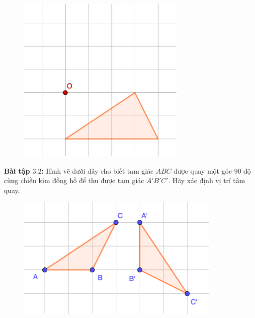 \begin{multicols}{2}
\begin{figure}[H]
		\includegraphics[width= 1\linewidth]{Picture27}
		\vspace*{-10pt}
	\end{figure}
	\textbf{\color{toancuabi}Bài tập $\pmb{3.2}$:} Hình vẽ dưới đây cho biết tam giác $ABC$ được quay một góc $90$ độ cùng chiều kim đồng hồ để thu được tam giác $A'B'C'$. Hãy xác định vị trí tâm quay.
	\begin{figure}[H]
		\vspace*{-5pt}
		\centering
		\captionsetup{labelformat= empty, justification=centering}
		\includegraphics[width= 1\linewidth]{Picture28}
		\vspace*{-10pt}

\end{figure}
\end{multicols}
